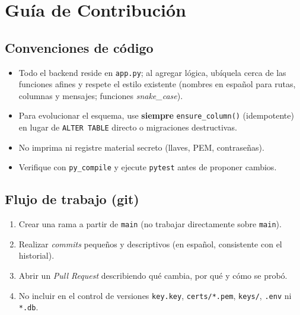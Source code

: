 \documentclass[10pt,letterpaper]{report}
\begin{document}
\chapter{Gu\'ia de Contribuci\'on}

\section{Convenciones de c\'odigo}
\begin{itemize}
  \item Todo el backend reside en \texttt{app.py}; al agregar l\'ogica, ub\'iquela cerca de las
  funciones afines y respete el estilo existente (nombres en espa\~nol para rutas, columnas y mensajes;
  funciones \emph{snake\_case}).
  \item Para evolucionar el esquema, use \textbf{siempre} \texttt{ensure\_column()} (idempotente) en
  lugar de \texttt{ALTER TABLE} directo o migraciones destructivas.
  \item No imprima ni registre material secreto (llaves, PEM, contrase\~nas).
  \item Verifique con \texttt{py\_compile} y ejecute \texttt{pytest} antes de proponer cambios.
\end{itemize}

\section{Flujo de trabajo (git)}
\begin{enumerate}
  \item Crear una rama a partir de \texttt{main} (no trabajar directamente sobre \texttt{main}).
  \item Realizar \emph{commits} peque\~nos y descriptivos (en espa\~nol, consistente con el historial).
  \item Abrir un \emph{Pull Request} describiendo qu\'e cambia, por qu\'e y c\'omo se prob\'o.
  \item No incluir en el control de versiones \texttt{key.key}, \texttt{certs/*.pem},
  \texttt{keys/}, \texttt{.env} ni \texttt{*.db}.
\end{enumerate}
\end{document}
